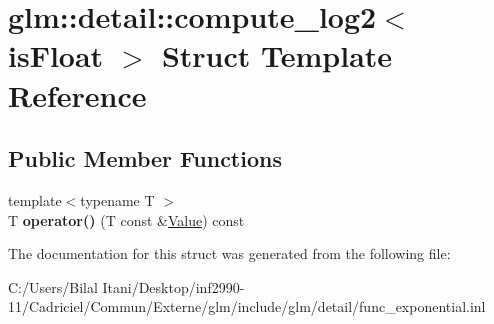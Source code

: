 \hypertarget{structglm_1_1detail_1_1compute__log2}{}\section{glm\+:\+:detail\+:\+:compute\+\_\+log2$<$ is\+Float $>$ Struct Template Reference}
\label{structglm_1_1detail_1_1compute__log2}
\subsection*{Public Member Functions}
\begin{DoxyCompactItemize}
\item 
{\footnotesize template$<$typename T $>$ }\\T {\bfseries operator()} (T const \&\hyperlink{document_8h_a071cf97155ba72ac9a1fc4ad7e63d481}{Value}) const \hypertarget{structglm_1_1detail_1_1compute__log2_a89ee0d494b7df86090055438a30bff32}{}\label{structglm_1_1detail_1_1compute__log2_a89ee0d494b7df86090055438a30bff32}

\end{DoxyCompactItemize}


The documentation for this struct was generated from the following file\+:\begin{DoxyCompactItemize}
\item 
C\+:/\+Users/\+Bilal Itani/\+Desktop/inf2990-\/11/\+Cadriciel/\+Commun/\+Externe/glm/include/glm/detail/func\+\_\+exponential.\+inl\end{DoxyCompactItemize}
